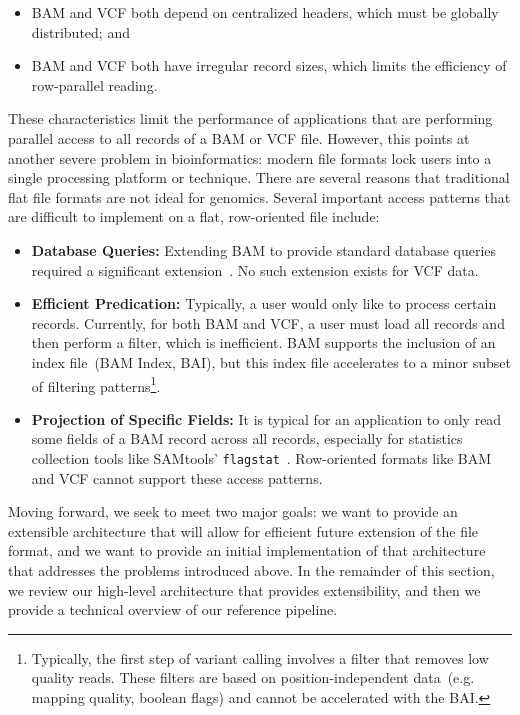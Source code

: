\documentclass{bioinfo}
\begin{document}
\begin{itemize}
\item BAM and VCF both depend on centralized headers, which must be globally distributed; and
\item BAM and VCF both have irregular record sizes, which limits the efficiency of row-parallel reading. 
\end{itemize}

These characteristics limit the performance of applications that are performing parallel access to all records of a BAM or VCF file. However,
this points at another severe problem in bioinformatics: modern file formats lock users into a single processing platform or technique. There are
several reasons that traditional flat file formats are not ideal for genomics. Several important access patterns that are difficult to implement on a flat,
row-oriented file include:

\begin{itemize}
\item \textbf{Database Queries:} Extending BAM to provide standard database queries required a significant extension~\citep{kozanitis13}.
No such extension exists for VCF data.
\item \textbf{Efficient Predication:} Typically, a user would only like to process certain records. Currently, for both BAM and VCF, a user must load all
records and then perform a filter, which is inefficient. BAM supports the inclusion of an index file~(BAM Index, BAI), but this index file accelerates
to a minor subset of filtering patterns\footnote{Typically, the first step of variant calling involves a filter that removes low quality reads. These filters
are based on position-independent data~(e.g. mapping quality, boolean flags) and cannot be accelerated with the BAI.}.
\item \textbf{Projection of Specific Fields:} It is typical for an application to only read some fields of a BAM record across all records, especially for
statistics collection tools like SAMtools' \texttt{flagstat}~\citep{li09}. Row-oriented formats like BAM and VCF cannot support these access patterns.
\end{itemize}

Moving forward, we seek to meet two major goals: we want to provide an extensible architecture that will allow for efficient future extension of the
file format, and we want to provide an initial implementation of that architecture that addresses the problems introduced above. In the remainder
of this section, we review our high-level architecture that provides extensibility, and then we provide a technical overview of our reference pipeline.
\end{document}
